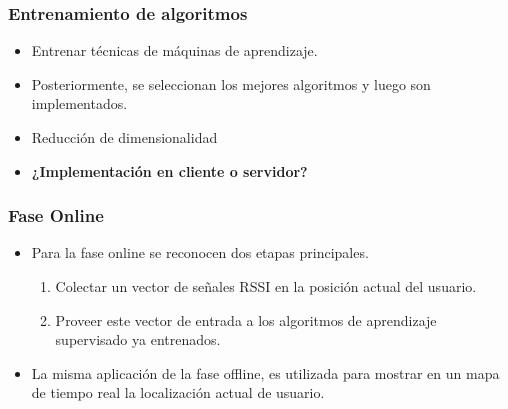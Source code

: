 \documentclass[handout]{beamer}
\begin{document}

\begin{frame}
\frametitle{Entrenamiento de algoritmos}

\begin{itemize}

\item Entrenar técnicas de máquinas de aprendizaje.

\pause
\item Posteriormente, se seleccionan los mejores algoritmos y luego son implementados.
\pause

\item Reducción de dimensionalidad
\pause

\item \textbf{¿Implementación en cliente o servidor?}

\end{itemize}

\end{frame}


\begin{frame}
\frametitle{Fase Online}

\begin{itemize}

\item Para la fase online se reconocen dos etapas principales.

\begin{enumerate}
\pause
\item Colectar un vector de señales RSSI en la posición actual del usuario.
\pause
\item Proveer este vector de entrada a los algoritmos de aprendizaje supervisado ya entrenados.
\end{enumerate}

\pause
\item La misma aplicación de la fase offline, es utilizada para mostrar en un mapa de tiempo real la localización actual de usuario.

\end{itemize}
\end{frame}


\end{document}
